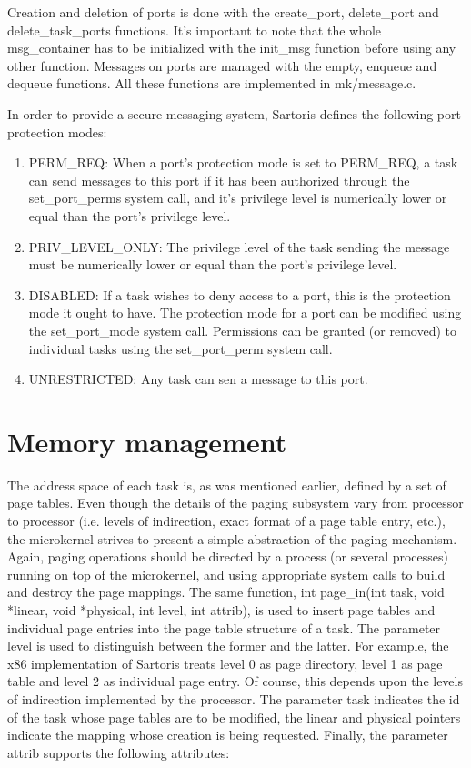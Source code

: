 \documentclass[11pt, letterpaper, twoside, english]{book}
\begin{document}
Creation and deletion of ports is done with the \textsf{create\_port}, \textsf{delete\_port} and \textsf{delete\_task\_ports} functions. It's important to note that the whole \textsf{msg\_container} has to be initialized with the \textsf{init\_msg} function before using any other function. Messages on ports are managed with the \textsf{empty}, \textsf{enqueue} and \textsf{dequeue} functions. All these functions are implemented in \textsf{mk/message.c}.

In order to provide a secure messaging system, Sartoris defines the following port protection modes:
\begin{enumerate}
\item[]\textsf{PERM\_REQ}: When a port's protection mode is set to \textsf{PERM\_REQ}, a task can send messages to this port if it has been authorized through the \textsf{set\_port\_perms} system call, and it's privilege level is numerically lower or equal than the port's privilege level.
\item[]\textsf{PRIV\_LEVEL\_ONLY}: The privilege level of the task sending the message must be numerically lower or equal than the port's privilege level.
\item[]\textsf{DISABLED}: If a task wishes to deny access to a port, this is the protection mode it ought to have.
The protection mode for a port can be modified using the \textsf{set\_port\_mode} system call. Permissions can be granted (or removed) to individual tasks using the \textsf{set\_port\_perm} system call.
\item[]\textsf{UNRESTRICTED}: Any task can sen a message to this port.
\end{enumerate} 

\section{Memory management} \label{sec:memorymanagement}

The address space of each task is, as was mentioned earlier, defined by a set of page tables. Even though the details of the paging subsystem vary from processor to processor (i.e. levels of indirection, exact format of a page table entry, etc.), the microkernel strives to present a simple abstraction of the paging mechanism. Again, paging operations should be directed by a process (or several processes) running on top of the microkernel, and using appropriate system calls to build and destroy the page mappings. The same function, \textsf{int page\_in(int task, void *linear, void *physical, int level, int attrib)}, is used to insert page tables and individual page entries into the page table structure of a task. The parameter \textsf{level} is used to distinguish between the former and the latter. For example, the x86 implementation of Sartoris treats level 0 as page directory, level 1 as page table and level 2 as individual page entry. Of course, this depends upon the levels of indirection implemented by the processor. The parameter \textsf{task} indicates the id of the task whose page tables are to be modified, the \textsf{linear} and \textsf{physical} pointers indicate the mapping whose creation is being requested. Finally, the parameter \textsf{attrib} supports the following attributes:
\end{document}
